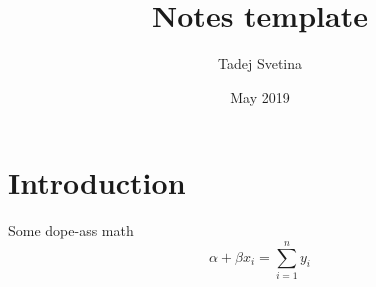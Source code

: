 \documentclass{notes}
\title{Notes template}
\author{Tadej Svetina}
\date{May 2019}
\begin{document}
\maketitle

\section{Introduction}

Some dope-ass math \texteuro
\begin{equation}
    \alpha + \beta x_i = \sum_{i=1}^n y_i
\end{equation}
\end{document}
